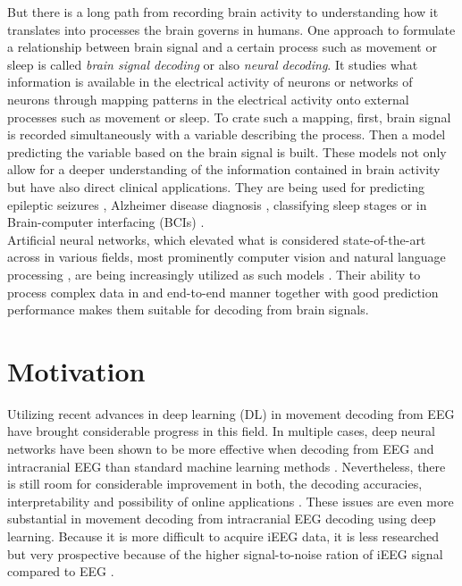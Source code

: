 But there is a long path from recording brain activity to understanding how it translates into processes the brain governs in humans.
One approach to formulate a relationship between brain signal and a certain process such as movement or sleep is called \textit{brain signal decoding} or also \textit{neural decoding}.
It studies what information is available in the electrical activity of neurons or networks of neurons through mapping patterns in the electrical activity onto external processes such as movement or sleep.
To crate such a mapping, first, brain signal is recorded simultaneously with a variable describing the process. 
Then a model predicting the variable based on the brain signal is built.
These models not only allow for a deeper understanding of the information contained in brain activity but have also direct clinical applications.
They are being used for predicting epileptic seizures \cite{epileptic-seizures-eeg}, Alzheimer disease diagnosis \cite{alzheimer-eeg}, classifying sleep stages \cite{sleep-stage-alg-comparison} or in Brain-computer interfacing (BCIs) \cite{ecog-bci, eeg-bci} .\\

Artificial neural networks, which elevated what is considered state-of-the-art across in various fields, most prominently computer vision \cite{dnn-computer-vision} and natural language processing \cite{dnn-nlp}, are being increasingly utilized as such models \cite{Roy-2019}. 
Their ability to process complex data in and end-to-end manner together with good prediction performance makes them suitable for decoding from brain signals. 


\section*{Motivation}
Utilizing recent advances in deep learning (DL) in movement decoding from EEG have brought considerable progress in this field.
In multiple cases, deep neural networks have been shown to be more effective when decoding from EEG and intracranial EEG than standard machine learning methods \cite{Zhang-2019, eeg-net, sleep-eegnet}.
Nevertheless, there is still room for considerable improvement in both, the decoding accuracies, interpretability and possibility of online applications \cite{Roy-2019}. 
These issues are even more substantial in movement decoding from intracranial EEG decoding using deep learning. 
Because it is more difficult to acquire iEEG data, it is less researched but very prospective because of the higher signal-to-noise ration of iEEG signal compared to EEG \cite{volkova-review}. \\

